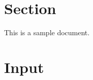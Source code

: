 \documentclass{article}
\begin{document}
\section{Section}
This is a sample document.

\section{Input}

\end{document}
